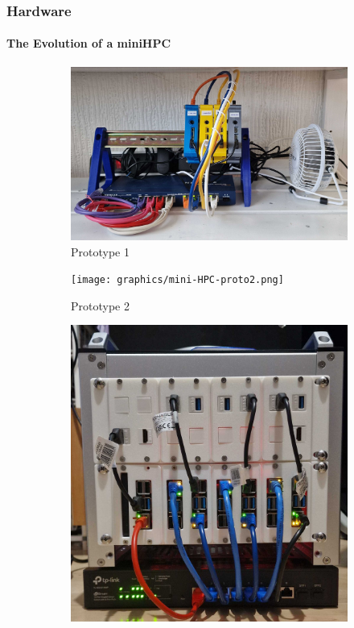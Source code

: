 \begin{frame}
	\frametitle{Hardware}
	\framesubtitle{The Evolution of a miniHPC}
	
	\begin{figure}
		\centering
		\begin{subfigure}[b]{0.24\textwidth}
			\centering
			\includegraphics[width=\textwidth]{graphics/mini-HPC-proto1.png}
			\caption{Prototype 1}
			\label{fig:2.a}
		\end{subfigure}
		\hfill
		\begin{subfigure}[b]{0.24\textwidth}
			\centering
			\texttt{[image: graphics/mini-HPC-proto2.png]}
			\caption{Prototype 2}
			\label{fig:2.b}
		\end{subfigure}
		\hfill
		\begin{subfigure}[b]{0.24\textwidth}
			\centering
			\includegraphics[width=\textwidth]{graphics/mini-HPC-proto3.png}

\end{subfigure}
\end{figure}
\end{frame}
